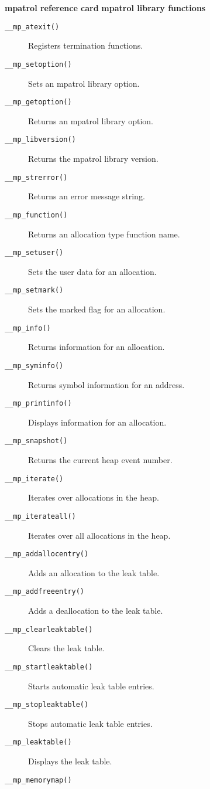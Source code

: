 \documentclass[a4paper,landscape,final]{article}
\newcommand{\heading}[1]{\textbf{\normalsize #1}}
\newcommand{\function}[1]{\texttt{#1()}}
\begin{document}
\begin{multicols}{3}{\textbf{\Large mpatrol reference card}}
\vskip 12pt
\heading{mpatrol library functions}
\vskip 6pt

\begin{description}
\item[\function{\_\_mp\_atexit}]
\hfill Registers termination functions.
\item[\function{\_\_mp\_setoption}]
\hfill Sets an mpatrol library option.
\item[\function{\_\_mp\_getoption}]
\hfill Returns an mpatrol library option.
\item[\function{\_\_mp\_libversion}]
\hfill Returns the mpatrol library version.
\item[\function{\_\_mp\_strerror}]
\hfill Returns an error message string.
\item[\function{\_\_mp\_function}]
\hfill Returns an allocation type function name.
\item[\function{\_\_mp\_setuser}]
\hfill Sets the user data for an allocation.
\item[\function{\_\_mp\_setmark}]
\hfill Sets the marked flag for an allocation.
\item[\function{\_\_mp\_info}]
\hfill Returns information for an allocation.
\item[\function{\_\_mp\_syminfo}]
\hfill Returns symbol information for an address.
\item[\function{\_\_mp\_printinfo}]
\hfill Displays information for an allocation.
\item[\function{\_\_mp\_snapshot}]
\hfill Returns the current heap event number.
\item[\function{\_\_mp\_iterate}]
\hfill Iterates over allocations in the heap.
\item[\function{\_\_mp\_iterateall}]
\hfill Iterates over all allocations in the heap.
\item[\function{\_\_mp\_addallocentry}]
\hfill Adds an allocation to the leak table.
\item[\function{\_\_mp\_addfreeentry}]
\hfill Adds a deallocation to the leak table.
\item[\function{\_\_mp\_clearleaktable}]
\hfill Clears the leak table.
\item[\function{\_\_mp\_startleaktable}]
\hfill Starts automatic leak table entries.
\item[\function{\_\_mp\_stopleaktable}]
\hfill Stops automatic leak table entries.
\item[\function{\_\_mp\_leaktable}]
\hfill Displays the leak table.
\item[\function{\_\_mp\_memorymap}]

\end{description}
\end{multicols}
\end{document}
